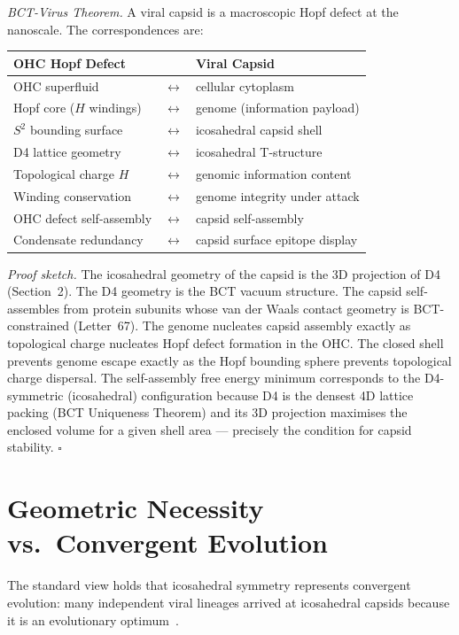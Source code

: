 \documentclass[aps,prl,preprint,superscriptaddress,floatfix]{revtex4-2}
\begin{document}
\textit{BCT-Virus Theorem.} A viral capsid is a macroscopic Hopf
defect at the nanoscale. The correspondences are:
\begin{center}
\begin{tabular}{lll}
\toprule
OHC Hopf Defect & & Viral Capsid \\
\midrule
OHC superfluid & $\leftrightarrow$ & cellular cytoplasm \\
Hopf core ($H$ windings) & $\leftrightarrow$ & genome (information payload) \\
$S^2$ bounding surface & $\leftrightarrow$ & icosahedral capsid shell \\
D4 lattice geometry & $\leftrightarrow$ & icosahedral T-structure \\
Topological charge $H$ & $\leftrightarrow$ & genomic information content \\
Winding conservation & $\leftrightarrow$ & genome integrity under attack \\
OHC defect self-assembly & $\leftrightarrow$ & capsid self-assembly \\
Condensate redundancy & $\leftrightarrow$ & capsid surface epitope display \\
\bottomrule
\end{tabular}
\end{center}

\textit{Proof sketch.} The icosahedral geometry of the capsid is
the 3D projection of D4 (Section~2). The D4 geometry is the BCT
vacuum structure. The capsid self-assembles from protein subunits
whose van der Waals contact geometry is BCT-constrained (Letter~67).
The genome nucleates capsid assembly exactly as topological charge
nucleates Hopf defect formation in the OHC. The closed shell
prevents genome escape exactly as the Hopf bounding sphere prevents
topological charge dispersal. The self-assembly free energy minimum
corresponds to the D4-symmetric (icosahedral) configuration because
D4 is the densest 4D lattice packing (BCT Uniqueness Theorem) and
its 3D projection maximises the enclosed volume for a given shell
area --- precisely the condition for capsid stability. $\square$

\section{Geometric Necessity vs.\ Convergent Evolution}

The standard view holds that icosahedral symmetry represents
convergent evolution: many independent viral lineages arrived at
icosahedral capsids because it is an evolutionary optimum~\cite{crick1956}.
\end{document}
